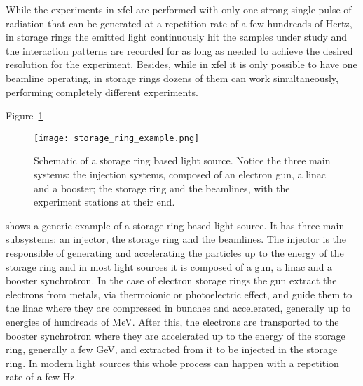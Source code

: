     While the experiments in \gls{xfel} are performed with only one strong single pulse of radiation that can be generated at a repetition rate of a few hundreads of Hertz, in storage rings the emitted light continuously hit the samples under study and the interaction patterns are recorded for as long as needed to achieve the desired resolution for the experiment. Besides, while in \gls{xfel} it is only possible to have one beamline operating, in storage rings dozens of them can work simultaneously, performing completely different experiments.

    Figure~\ref{fig:light_source_example}
    \begin{figure}[b!]
        \center
        \texttt{[image: storage\_ring\_example.png]}
        \caption[Schematic of a storage ring based light source.]{Schematic of a storage ring based light source. Notice the three main systems: the injection systems, composed of an electron gun, a \gls{linac} and a booster; the storage ring and the beamlines, with the experiment stations at their end.}
        \label{fig:light_source_example}
    \end{figure}
    shows a generic example of a storage ring based light source. It has three main subsystems: an injector, the storage ring and the beamlines. The injector is the responsible of generating and accelerating the particles up to the energy of the storage ring and in most light sources it is composed of a gun, a \gls{linac} and a booster synchrotron. In the case of electron storage rings the gun extract the electrons from metals, via thermoionic or photoelectric effect, and guide them to the \gls{linac} where they are compressed in bunches and accelerated, generally up to energies of hundreads of \si{\mega\electronvolt}. After this, the electrons are transported to the booster synchrotron where they are accelerated up to the energy of the storage ring, generally a few \si{\giga\electronvolt}, and extracted from it to be injected in the storage ring. In modern light sources this whole process can happen with a repetition rate of a few \si{\hertz}.

